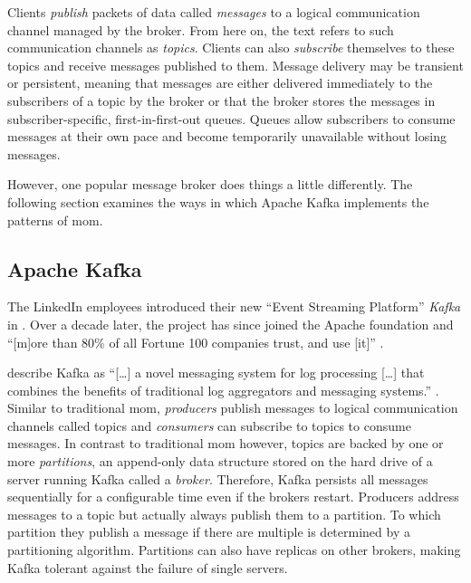 Clients \emph{publish} packets of data called \emph{messages} to a logical communication channel managed by the broker.
From here on, the text refers to such communication channels as \emph{topics}.
Clients can also \emph{subscribe} themselves to these topics and receive messages published to them.
Message delivery may be transient or persistent, meaning that messages are either delivered immediately to the subscribers of a topic by the broker or that the broker stores the messages in subscriber-specific, first-in-first-out queues.
Queues allow subscribers to consume messages at their own pace and become temporarily unavailable without losing messages.
\parencite{curry_message-oriented_2004}

However, one popular message broker does things a little differently.
The following section examines the ways in which Apache Kafka implements the patterns of \gls{mom}.

\subsection{Apache Kafka}

The LinkedIn employees \citeauthor{kreps_kafka_2011} introduced their new \enquote{Event Streaming Platform} \emph{Kafka} in \citeyear{kreps_kafka_2011} \parencite{kreps_kafka_2011}.
Over a decade later, the project has since joined the Apache foundation and \enquote{[m]ore than 80\% of all Fortune 100 companies trust, and use [it]} \parencite{apache_software_foundation_apache_nodate}.

\citeauthor{kreps_kafka_2011} describe Kafka as \enquote{[\ldots] a novel messaging system for log processing [\ldots] that combines the benefits of traditional log aggregators and messaging systems.} \parencite{kreps_kafka_2011}.
Similar to traditional \gls{mom}, \emph{producers} publish messages to logical communication channels called topics and \emph{consumers} can subscribe to topics to consume messages.
In contrast to traditional \gls{mom} however, topics are backed by one or more \emph{partitions}, an append-only data structure stored on the hard drive of a server running Kafka called a \emph{broker}.
Therefore, Kafka persists all messages sequentially for a configurable time even if the brokers restart.
Producers address messages to a topic but actually always publish them to a partition.
To which partition they publish a message if there are multiple is determined by a partitioning algorithm.
Partitions can also have replicas on other brokers, making Kafka tolerant against the failure of single servers.
\parencite{kreps_kafka_2011}

